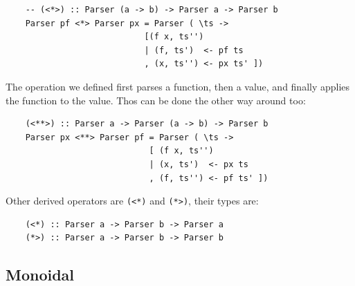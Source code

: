 \documentclass[a4paper,12pt]{article}
\theoremstyle{remark}
\begin{document}
\begin{lstlisting}
    -- (<*>) :: Parser (a -> b) -> Parser a -> Parser b
    Parser pf <*> Parser px = Parser ( \ts ->
                            [(f x, ts'')
                            | (f, ts')  <- pf ts
                            , (x, ts'') <- px ts' ])  \end{lstlisting}

\begin{figure}[H]
  \centering
\end{figure}

The operation we defined first parses a function, then a value, and finally applies
the function to the value. Thos can be done the other way around too:

\begin{lstlisting}
    (<**>) :: Parser a -> Parser (a -> b) -> Parser b
    Parser px <**> Parser pf = Parser ( \ts ->
                             [ (f x, ts'')
                             | (x, ts')  <- px ts
                             , (f, ts'') <- pf ts' ])  \end{lstlisting}

\begin{figure}[H]
  \centering
\end{figure}

Other derived operators are \lstinline{(<*)} and \lstinline{(*>)}, their types are:

\begin{lstlisting}
    (<*) :: Parser a -> Parser b -> Parser a
    (*>) :: Parser a -> Parser b -> Parser b  \end{lstlisting}

\subsection{Monoidal}
\end{document}
